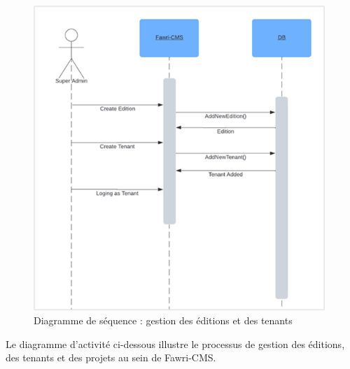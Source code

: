 \begin{enumerate}
        \begin{figure}[H]
          \centering
          \includegraphics[width=11cm]{Figures/diagsec_Gestion_editions_tenants.png}
          \caption{Diagramme de séquence : gestion des éditions et des tenants}
        \end{figure}

        Le diagramme d'activité ci-dessous illustre le processus de gestion des éditions, des tenants et des projets au sein de Fawri-CMS.





\end{enumerate}




